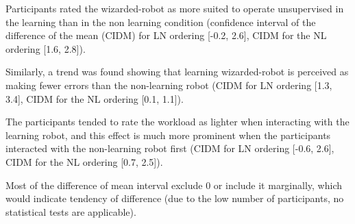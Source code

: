 Participants rated the wizarded-robot as more suited to operate unsupervised in the learning than in the non learning condition (confidence interval of the difference of the mean (CIDM) for LN ordering [-0.2, 2.6], CIDM for the NL ordering [1.6, 2.8]).

Similarly, a trend was found showing that learning wizarded-robot is perceived as making fewer errors than the non-learning robot (CIDM for LN ordering [1.3, 3.4], CIDM for the NL ordering [0.1, 1.1]). 

The participants tended to rate the workload as lighter when interacting with the learning robot, and this effect is much more prominent when the participants interacted with the non-learning robot first (CIDM for LN ordering [-0.6, 2.6], CIDM for the NL ordering [0.7, 2.5]).

Most of the difference of mean interval exclude 0 or include it marginally, which would indicate tendency of difference (due to the low number of participants, no statistical tests are applicable).

